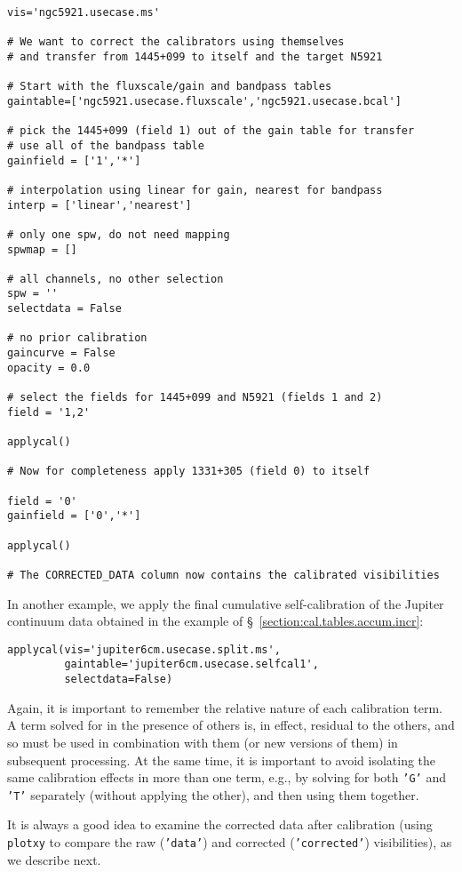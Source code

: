 {\begin{verbatim}
vis='ngc5921.usecase.ms'

# We want to correct the calibrators using themselves
# and transfer from 1445+099 to itself and the target N5921

# Start with the fluxscale/gain and bandpass tables
gaintable=['ngc5921.usecase.fluxscale','ngc5921.usecase.bcal']
         
# pick the 1445+099 (field 1) out of the gain table for transfer
# use all of the bandpass table
gainfield = ['1','*']

# interpolation using linear for gain, nearest for bandpass
interp = ['linear','nearest']

# only one spw, do not need mapping
spwmap = []

# all channels, no other selection
spw = ''
selectdata = False

# no prior calibration
gaincurve = False
opacity = 0.0

# select the fields for 1445+099 and N5921 (fields 1 and 2)
field = '1,2'

applycal()

# Now for completeness apply 1331+305 (field 0) to itself

field = '0'
gainfield = ['0','*']

applycal()

# The CORRECTED_DATA column now contains the calibrated visibilities
\end{verbatim}
\normalsize

In another example, we apply the final cumulative self-calibration 
of the Jupiter continuum data obtained in the example of
\S~\ref{section:cal.tables.accum.incr}:
\small
\begin{verbatim}
applycal(vis='jupiter6cm.usecase.split.ms',
         gaintable='jupiter6cm.usecase.selfcal1',
         selectdata=False)
\end{verbatim}
\normalsize

Again, it is important to remember the relative nature of each calibration
term.  A term solved for in the presence of others is, in effect,
residual to the others, and so must be used in combination with them
(or new versions of them) in subsequent processing.  At the same time,
it is important to avoid isolating the same calibration effects in
more than one term, e.g., by solving for both {\tt 'G'} and {\tt 'T'} 
separately (without applying the other), and then using them together.  

It is always a good idea to examine the corrected data after calibration
(using {\tt plotxy} to compare the raw ({\tt 'data'}) and corrected 
({\tt 'corrected'}) visibilities), as we describe next.

}
